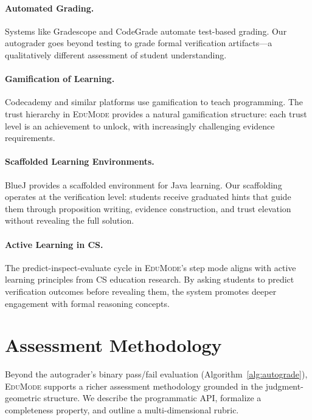 \documentclass[11pt]{article}
\newcommand{\EduMode}{\textsc{EduMode}}
\begin{document}
\paragraph{Automated Grading.}
Systems like Gradescope and CodeGrade automate test-based grading. Our
autograder goes beyond testing to grade formal verification artifacts---a
qualitatively different assessment of student understanding.

\paragraph{Gamification of Learning.}
Codecademy and similar platforms use gamification to teach programming. The
trust hierarchy in \EduMode{} provides a natural gamification structure:
each trust level is an achievement to unlock, with increasingly challenging
evidence requirements.

\paragraph{Scaffolded Learning Environments.}
BlueJ provides a scaffolded environment for Java learning. Our scaffolding
operates at the verification level: students receive graduated hints that
guide them through proposition writing, evidence construction, and trust
elevation without revealing the full solution.

\paragraph{Active Learning in CS.}
The predict-inspect-evaluate cycle in \EduMode{}'s step mode aligns with
active learning principles from CS education research. By asking students to
predict verification outcomes before revealing them, the system promotes
deeper engagement with formal reasoning concepts.

\section{Assessment Methodology}\label{sec:assessment}

Beyond the autograder's binary pass/fail evaluation
(Algorithm~\ref{alg:autograde}), \EduMode{} supports a richer assessment
methodology grounded in the judgment-geometric structure. We describe the
programmatic API, formalize a completeness property, and outline a
multi-dimensional rubric.
\end{document}
